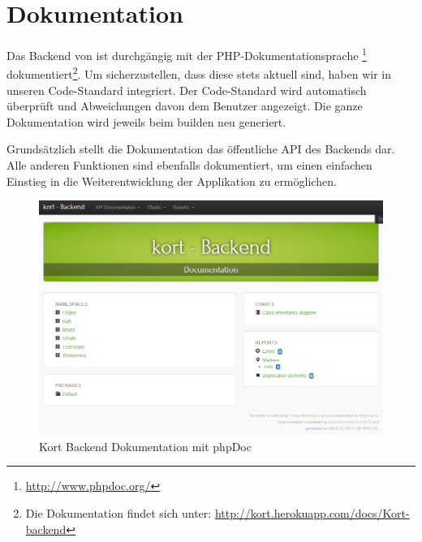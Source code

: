 \section{Dokumentation}
\label{backend-dokumentation}

Das Backend von \kort ist durchgängig mit der PHP-Dokumentationsprache \footnote{\url{http://www.phpdoc.org/}} dokumentiert\footnote{Die Dokumentation findet sich unter: \url{http://kort.herokuapp.com/docs/Kort-backend}}.
Um sicherzustellen, dass diese stets aktuell sind, haben wir  in unseren Code-Standard integriert.
Der Code-Standard wird automatisch überprüft und Abweichungen davon dem Benutzer angezeigt.
Die ganze Dokumentation wird jeweils beim builden neu generiert.

Grundsätzlich stellt die Dokumentation das öffentliche \gls{API} des Backends dar.
Alle anderen Funktionen sind ebenfalls dokumentiert, um einen einfachen Einstieg in die Weiterentwicklung der Applikation zu ermöglichen.

\begin{figure}[H]
	\centering
	\includegraphics[width=\textwidth]{images/implementation/backend/kort-backend-documentation}
	\caption{Kort Backend Dokumentation mit phpDoc}
	\label{image-kort-backend-documentation}
\end{figure}
